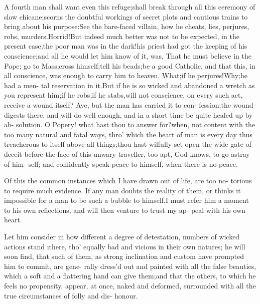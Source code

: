 \documentclass[twoside]{article}
\begin{document}
\lqq A fourth man shall want even this\break
\lqq refuge;\tsk shall break through all this\break
\lqq ceremony of slow chicane;\tsk scorns\break
\lqq the doubtful workings of secret plots\break
\lqq and cautious trains to bring about his\break
\lqq purpose:\tsh See the bare-faced villain,\break
\lqq how he cheats, lies, perjures, robs,\break
\lqq murders.\tsh Horrid!\tsh But indeed\break
\lqq much better was not to be expected,\break
\lqq in the present case,\tsk the poor man\break
\lqq was in the dark!\tsk his priest had got
\lqq the keeping of his conscience;\tsk and\break
\lqq all he would let him know of it, was,\break
\lqq That he must believe in the Pope;\tsk\break
\lqq go to Mass;\tsk cross himself;\tsk tell his\break
\lqq beads;\tsh be a good Catholic, and\break
\lqq that this, in all conscience, was enough\break
\lqq to carry him to heaven.  What;\tsk if\break
\lqq he perjures!\tsk Why;\tsk he had a men-\break
\lqq tal reservation in it.\tsk But if he is so\break
\lqq wicked and abandoned a wretch as\break
\lqq you represent him;\tsk if he robs,\tsk if\break
\lqq he stabs,\tsk will not conscience, on every 
\lqq such act, receive a wound itself? Aye,\break
\lqq \tsk but the man has carried it to con-\break
\lqq fession;\tsk the wound digests there,\break
\lqq and will do well enough, and in a\break
\lqq short time be quite healed up by ab-\break
\lqq solution. O Popery! what hast thou\break
\lqq to answer for?\tsk when, not content\break
\lqq with the too many natural and fatal\break
\lqq ways, thro’ which the heart of man is
\lqq every day thus treacherous to itself\break
\lqq above all things;\tsk thou hast wilfully\break
\lqq set open the wide gate of deceit before\break
\lqq the face of this unwary traveller, too\break
\lqq apt, God knows, to go astray of him-\break
\lqq self; and confidently speak peace to\break
\lqq himself, when there is no peace.

\lqq Of this the common instances which\break
\lqq I have drawn out of life, are too no-\break
\lqq torious to require much evidence. If\break
\lqq any man doubts the reality of them,\break
\lqq or thinks it impossible for a man to be\break
\lqq such a bubble to himself,\tsk I must refer\break
\lqq him a moment to his own reflections,\break
\lqq and will then venture to trust my ap-\break
\lqq peal with his own heart.  

\lqq Let him consider in how different\break
\lqq a degree of detestation, numbers of\break
\lqq wicked actions stand \i{there}, tho’ equally
\lqq bad and vicious in their own natures;\break
\lqq \tsk he will soon find, that such of them,\break
\lqq as strong inclination and custom have\break
\lqq prompted him to commit, are gene-\break
\lqq rally dress’d out and painted with all\break
\lqq the false beauties, which a soft and a\break
\lqq flattering hand can give them;\tsk and\break
\lqq that the others, to which he feels no\break
\lqq propensity, appear, at once, naked and\break
\lqq deformed, surrounded with all the\break
\lqq true circumstances of folly and dis-\break
\lqq honour.
\end{document}
